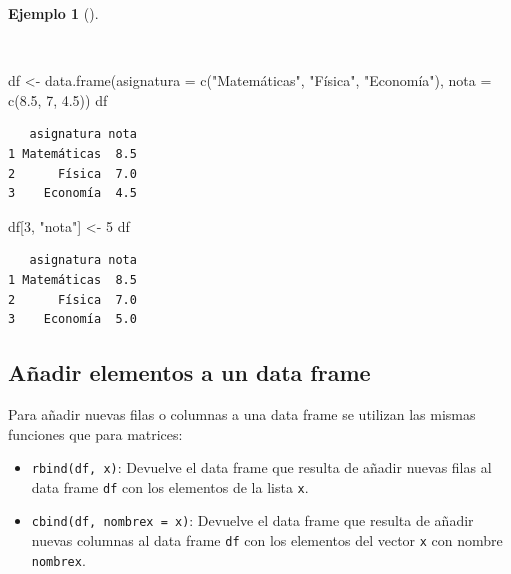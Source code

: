 \documentclass[
  a4paper,
]{scrreport}
\newenvironment{Shaded}{\begin{snugshade}}{\end{snugshade}}
\newcommand{\AttributeTok}[1]{\textcolor[rgb]{0.40,0.45,0.13}{#1}}
\newcommand{\DecValTok}[1]{\textcolor[rgb]{0.68,0.00,0.00}{#1}}
\newcommand{\FloatTok}[1]{\textcolor[rgb]{0.68,0.00,0.00}{#1}}
\newcommand{\FunctionTok}[1]{\textcolor[rgb]{0.28,0.35,0.67}{#1}}
\newcommand{\NormalTok}[1]{\textcolor[rgb]{0.00,0.23,0.31}{#1}}
\newcommand{\OtherTok}[1]{\textcolor[rgb]{0.00,0.23,0.31}{#1}}
\newcommand{\StringTok}[1]{\textcolor[rgb]{0.13,0.47,0.30}{#1}}
\theoremstyle{definition}
\theoremstyle{definition}
\newtheorem{example}{Ejemplo}[chapter]
\theoremstyle{remark}
\begin{document}
\begin{example}[]\protect\hypertarget{exm-modificacion-data-frames}{}\label{exm-modificacion-data-frames}

~

\begin{Shaded}
\begin{Highlighting}[]
\NormalTok{df }\OtherTok{\textless{}{-}} \FunctionTok{data.frame}\NormalTok{(}\AttributeTok{asignatura =} \FunctionTok{c}\NormalTok{(}\StringTok{"Matemáticas"}\NormalTok{, }\StringTok{"Física"}\NormalTok{, }\StringTok{"Economía"}\NormalTok{), }\AttributeTok{nota =} \FunctionTok{c}\NormalTok{(}\FloatTok{8.5}\NormalTok{, }\DecValTok{7}\NormalTok{, }\FloatTok{4.5}\NormalTok{))}
\NormalTok{df}
\end{Highlighting}
\end{Shaded}

\begin{verbatim}
   asignatura nota
1 Matemáticas  8.5
2      Física  7.0
3    Economía  4.5
\end{verbatim}

\begin{Shaded}
\begin{Highlighting}[]
\NormalTok{df[}\DecValTok{3}\NormalTok{, }\StringTok{"nota"}\NormalTok{] }\OtherTok{\textless{}{-}} \DecValTok{5}
\NormalTok{df}
\end{Highlighting}
\end{Shaded}

\begin{verbatim}
   asignatura nota
1 Matemáticas  8.5
2      Física  7.0
3    Economía  5.0
\end{verbatim}

\end{example}

\subsection{Añadir elementos a un data
frame}\label{auxf1adir-elementos-a-un-data-frame}

Para añadir nuevas filas o columnas a una data frame se utilizan las
mismas funciones que para matrices:

\begin{itemize}
\item
  \texttt{rbind(df,\ x)}: Devuelve el data frame que resulta de añadir
  nuevas filas al data frame \texttt{df} con los elementos de la lista
  \texttt{x}.
\item
  \texttt{cbind(df,\ nombrex\ =\ x)}: Devuelve el data frame que resulta
  de añadir nuevas columnas al data frame \texttt{df} con los elementos
  del vector \texttt{x} con nombre \texttt{nombrex}.
\end{itemize}
\end{document}
